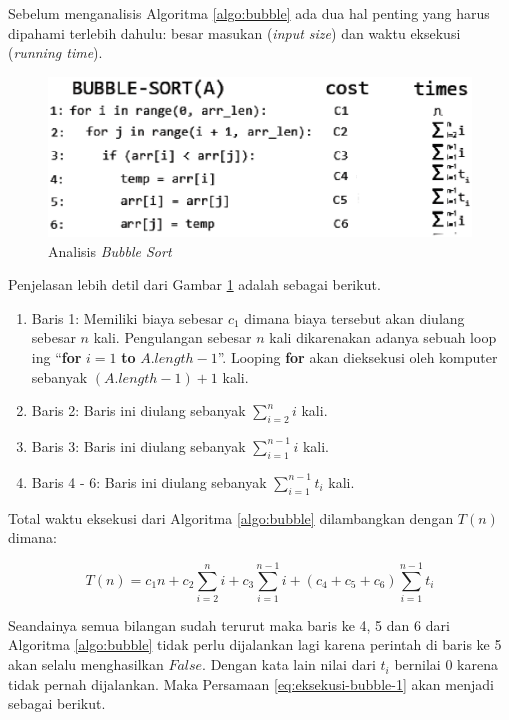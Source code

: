 Sebelum menganalisis Algoritma \ref{algo:bubble} ada dua hal penting yang harus dipahami terlebih dahulu: besar masukan (\textit{input size}) dan waktu eksekusi (\textit{running time}). 

\begin{figure}[htbp]%
	\includegraphics[scale=0.6]{fig/BubbleAnalysis}%
	\caption{Analisis \textit{Bubble Sort}}%
	\label{fig:analisis-bubble-sort}%
\end{figure}

\FloatBarrier

Penjelasan lebih detil dari Gambar \ref{fig:analisis-bubble-sort} adalah sebagai berikut.

\begin{enumerate}
	\item Baris 1: Memiliki biaya sebesar $c_1$ dimana biaya tersebut akan diulang sebesar $n$ kali. Pengulangan sebesar $n$ kali dikarenakan adanya sebuah loop	ing ``\textbf{for} $i=1$ \textbf{to} $A.length-1$''. Looping \textbf{for} akan dieksekusi oleh komputer sebanyak $(A.length-1)+1$ kali.
	\item Baris 2: Baris ini diulang sebanyak $\sum\limits_{i=2}^n i$ kali. 
	\item Baris 3: Baris ini diulang sebanyak $\sum\limits_{i=1}^{n-1} i$ kali.
	\item Baris 4 - 6: Baris ini diulang sebanyak $\sum\limits_{i=1}^{n-1} t_{i}$ kali.
\end{enumerate} 

Total waktu eksekusi dari Algoritma \ref{algo:bubble} dilambangkan dengan $T(n)$ dimana:

\begin{equation}\label{eq:eksekusi-bubble-1}
    T(n) = c_{1}n + c_{2}\sum\limits_{i=2}^n i + c_{3}\sum\limits_{i=1}^{n-1} i + (c_{4}+c_{5}+c_{6})\sum\limits_{i=1}^{n-1} t_{i} 
\end{equation} 

Seandainya semua bilangan sudah terurut maka baris ke 4, 5 dan 6 dari Algoritma \ref{algo:bubble} tidak perlu dijalankan lagi karena perintah di baris ke 5 akan selalu menghasilkan $False$. Dengan kata lain nilai dari $t_{i}$ bernilai 0 karena tidak pernah dijalankan. Maka Persamaan \ref{eq:eksekusi-bubble-1} akan menjadi sebagai berikut.

